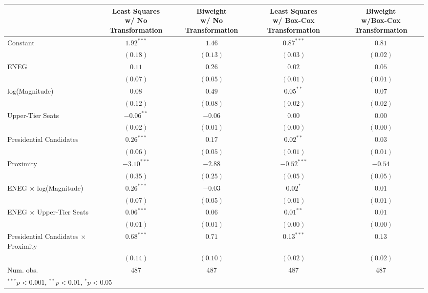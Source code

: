 
\begin{tabular}{l c c c c }
\hline
                                           & \specialcell{Least Squares\\w/ No Transformation} & \specialcell{Biweight\\w/ No Transformation} & \specialcell{Least Squares\\w/ Box-Cox Transformation} & \specialcell{Biweight\\w/Box-Cox Transformation} \\
\hline
Constant                                   & $1.92^{***}$  & $1.46$   & $0.87^{***}$  & $0.81$   \\
                                           & $(0.18)$      & $(0.13)$ & $(0.03)$      & $(0.02)$ \\
ENEG                                       & $0.11$        & $0.26$   & $0.02$        & $0.05$   \\
                                           & $(0.07)$      & $(0.05)$ & $(0.01)$      & $(0.01)$ \\
log(Magnitude)                             & $0.08$        & $0.49$   & $0.05^{**}$   & $0.07$   \\
                                           & $(0.12)$      & $(0.08)$ & $(0.02)$      & $(0.02)$ \\
Upper-Tier Seats                           & $-0.06^{**}$  & $-0.06$  & $0.00$        & $0.00$   \\
                                           & $(0.02)$      & $(0.01)$ & $(0.00)$      & $(0.00)$ \\
Presidential Candidates                    & $0.26^{***}$  & $0.17$   & $0.02^{**}$   & $0.03$   \\
                                           & $(0.06)$      & $(0.05)$ & $(0.01)$      & $(0.01)$ \\
Proximity                                  & $-3.10^{***}$ & $-2.88$  & $-0.52^{***}$ & $-0.54$  \\
                                           & $(0.35)$      & $(0.25)$ & $(0.05)$      & $(0.05)$ \\
ENEG $\times$ log(Magnitude)               & $0.26^{***}$  & $-0.03$  & $0.02^{*}$    & $0.01$   \\
                                           & $(0.07)$      & $(0.05)$ & $(0.01)$      & $(0.01)$ \\
ENEG $\times$ Upper-Tier Seats             & $0.06^{***}$  & $0.06$   & $0.01^{**}$   & $0.01$   \\
                                           & $(0.01)$      & $(0.01)$ & $(0.00)$      & $(0.00)$ \\
Presidential Candidates $\times$ Proximity & $0.68^{***}$  & $0.71$   & $0.13^{***}$  & $0.13$   \\
                                           & $(0.14)$      & $(0.10)$ & $(0.02)$      & $(0.02)$ \\
\hline
Num. obs.                                  & 487           & 487      & 487           & 487      \\
\hline
\multicolumn{5}{l}{\scriptsize{$^{***}p<0.001$, $^{**}p<0.01$, $^*p<0.05$}}
\end{tabular}
